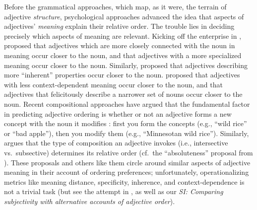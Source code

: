 \documentclass[manuscript]{stjour}
\begin{document}
Before the grammatical approaches, which map, as it were, the terrain of adjective \emph{structure}, psychological approaches advanced the idea that aspects of adjectives' \emph{meaning} explain their relative order. The trouble lies in deciding precisely which aspects of meaning are relevant. 
Kicking off the enterprise in \citeyear{sweet1898}, \citeauthor{sweet1898} proposed that adjectives which are more closely connected with the noun in meaning occur closer to the noun, and that adjectives with a more specialized meaning occur closer to the noun. Similarly, \cite{whorf1945} proposed that adjectives describing more ``inherent'' properties occur closer to the noun. \cite{ziff1960} proposed that adjectives with less context-dependent meaning occur closer to the noun, and that adjectives that felicitously describe a narrower set of nouns occur closer to the noun. 
Recent compositional approaches have argued that the fundamental factor in predicting adjective ordering is whether or not an adjective forms a new concept with the noun it modifies \citep{McNally2004,svenonius2008}: first you form the concepts (e.g., ``wild rice'' or ``bad apple''), then you modify them (e.g., ``Minnesotan wild rice''). Similarly, \cite{truswell2009} argues that the type of composition an adjective invokes (i.e., intersective vs.~subsective) determines its relative order (cf.~the ``absoluteness'' proposal from \citealp{Sproat1991}). These proposals and others like them circle around similar aspects of adjective meaning in their account of ordering preferences; unfortunately, operationalizing metrics like meaning distance, specificity, inherence, and context-dependence is not a trivial task (but see the attempt in \citealp{martin1969}, as well as our \emph{SI: Comparing subjectivity with alternative accounts of adjective order}). 
\end{document}
